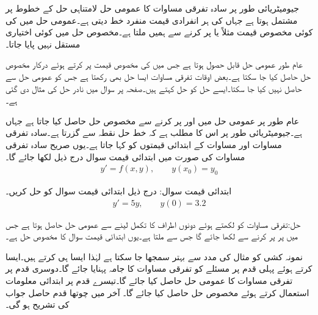 جیومیٹریائی طور پر سادہ تفرقی مساوات کا عمومی حل لامتناہی حل کے خطوط پر مشتمل ہوتا ہے جہاں  کی ہر انفرادی قیمت منفرد خط دیتی ہے۔عمومی حل میں  کی کوئی مخصوص قیمت مثلاً  یا  پر کرنے سے ہمیں  ملتا ہے۔مخصوص حل میں کوئی اختیاری مستقل نہیں پایا جاتا۔

عام طور عمومی حل قابل حصول ہوتا ہے جس میں  کی مخصوص قیمت پر کرتے ہوئے درکار مخصوص حل حاصل کیا جا سکتا ہے۔بعض اوقات تفرقی مساوات ایسا حل بھی رکھتا ہے جس کو عمومی حل سے حاصل نہیں کیا جا سکتا۔ایسے حل کو  حل کہتے ہیں۔صفحہ  پر سوال  میں نادر حل کی مثال دی گئی ہے۔

عام طور پر عمومی حل میں   اور  پر کرنے سے مخصوص حل حاصل کیا جاتا ہے جہاں    ہے۔جیومیٹریائی طور پر اس کا مطلب ہے کہ خط حل نقطہ  سے گزرتا ہے۔سادہ تفرقی مساوات اور مساوات کے ابتدائی قیمتوں کو  کہا جاتا ہے۔یوں صریح سادہ تفرقی مساوات کی صورت میں ابتدائی قیمت سوال درج ذیل لکھا جائے گا۔
\begin{align}
y'=f(x,y), \quad \quad y(x_0)=y_0
\end{align}

ابتدائی قیمت سوال: درج ذیل ابتدائی قیمت سوال کو حل کریں۔
\begin{align*}
y'=5y,\quad \quad y(0)=3.2
\end{align*}

حل:تفرقی مساوات کو  لکھتے ہوئے دونوں اطراف کا تکمل لینے سے  عمومی حل حاصل ہوتا ہے جس میں  پر  پر کرنے سے  لکھا جائے گا جس سے  ملتا ہے۔یوں ابتدائی قیمت سوال کا مخصوص حل  ہے۔

نمونہ کشی کو مثال کی مدد سے بہتر سمجھا جا سکتا ہے لہٰذا ایسا ہی کرتے ہیں۔ایسا کرتے ہوئے پہلی قدم پر  مسئلے کو تفرقی مساوات کا جامہ پہنایا جائے گا۔دوسری قدم پر تفرقی مساوات کا عمومی حل حاصل کیا جائے گا۔تیسرے قدم پر ابتدائی معلومات استعمال کرتے ہوئے مخصوص حل حاصل کیا جائے گا۔ آخر میں چوتھا قدم حاصل جواب کی تشریح ہو گی۔ 

